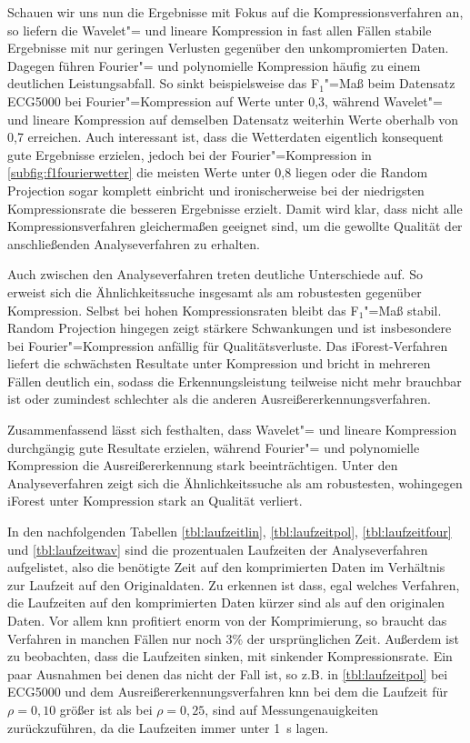 Schauen wir uns nun die Ergebnisse mit Fokus auf die Kompressionsverfahren an, so liefern die Wavelet"= und lineare Kompression in fast allen Fällen stabile Ergebnisse mit nur geringen Verlusten gegenüber den unkompromierten Daten. Dagegen führen Fourier"= und polynomielle Kompression häufig zu einem deutlichen Leistungsabfall. So sinkt beispielsweise das F$_1$"=Maß beim Datensatz ECG5000 bei Fourier"=Kompression auf Werte unter 0,3, während Wavelet"= und lineare Kompression auf demselben Datensatz weiterhin Werte oberhalb von 0,7 erreichen. Auch interessant ist, dass die Wetterdaten eigentlich konsequent gute Ergebnisse erzielen, jedoch bei der Fourier"=Kompression in \autoref{subfig:f1fourierwetter} die meisten Werte unter 0,8 liegen oder die Random Projection sogar komplett einbricht und ironischerweise bei der niedrigsten Kompressionsrate die besseren Ergebnisse erzielt. Damit wird klar, dass nicht alle Kompressionsverfahren gleichermaßen geeignet sind, um die gewollte Qualität der anschließenden Analyseverfahren zu erhalten.

Auch zwischen den Analyseverfahren treten deutliche Unterschiede auf. So erweist sich die Ähnlichkeitssuche insgesamt als am robustesten gegenüber Kompression. Selbst bei hohen Kompressionsraten bleibt das F$_1$"=Maß stabil. Random Projection hingegen zeigt stärkere Schwankungen und ist insbesondere bei Fourier"=Kompression anfällig für Qualitätsverluste. Das iForest-Verfahren liefert die schwächsten Resultate unter Kompression und bricht in mehreren Fällen deutlich ein, sodass die Erkennungsleistung teilweise nicht mehr brauchbar ist oder zumindest schlechter als die anderen Ausreißererkennungsverfahren.

Zusammenfassend lässt sich festhalten, dass Wavelet"= und lineare Kompression durchgängig gute Resultate erzielen, während Fourier"= und polynomielle Kompression die Ausreißererkennung stark beeinträchtigen. Unter den Analyseverfahren zeigt sich die Ähnlichkeitssuche als am robustesten, wohingegen iForest unter Kompression stark an Qualität verliert.

In den nachfolgenden Tabellen \ref{tbl:laufzeitlin}, \ref{tbl:laufzeitpol}, \ref{tbl:laufzeitfour} und \ref{tbl:laufzeitwav} sind die prozentualen Laufzeiten der Analyseverfahren aufgelistet, also die benötigte Zeit auf den komprimierten Daten im Verhältnis zur Laufzeit auf den Originaldaten. Zu erkennen ist dass, egal welches Verfahren, die Laufzeiten auf den komprimierten Daten kürzer sind als auf den originalen Daten. Vor allem knn profitiert enorm von der Komprimierung, so braucht das Verfahren in manchen Fällen nur noch 3\% der ursprünglichen Zeit. Außerdem ist zu beobachten, dass die Laufzeiten sinken, mit sinkender Kompressionsrate. Ein paar Ausnahmen bei denen das nicht der Fall ist, so z.B. in \autoref{tbl:laufzeitpol} bei ECG5000 und dem Ausreißererkennungsverfahren knn bei dem die Laufzeit für $\rho=0,10$ größer ist als bei $\rho=0,25$, sind auf Messungenauigkeiten zurückzuführen, da die Laufzeiten immer unter 1~s lagen.

